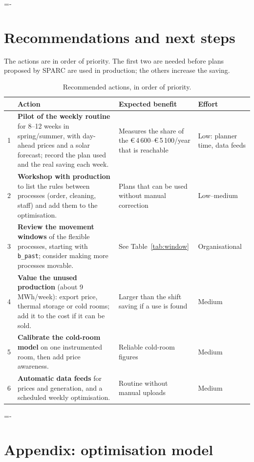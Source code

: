 \documentclass[10pt,a4paper]{scrartcl}
\makeatletter
\newcommand{\Eur}[1]{\euro\,#1}
\newcommand{\NeedSpace}[1]{\par\begingroup\dimen@=\pagegoal\advance\dimen@-\pagetotal
    \ifdim\dimen@<#1\relax\newpage\fi\endgroup}
\newcommand{\RuleSection}[1]{%
    \NeedSpace{10\baselineskip}%
    \section{#1}%
    \vspace{0.2em}{\color{accent!35}\hrule height 0.4pt}\vspace{0.3em}%
  }
\makeatother
\begin{document}
  \newpage
  \RuleSection{Recommendations and next steps}
  \label{sec:next}

  The actions are in order of priority. The first two are needed before plans proposed by SPARC are
  used in production; the others increase the saving.

  \begin{table}[H]
  \small
  \centering
  \renewcommand{\arraystretch}{1.2}
  \begin{tabularx}{\textwidth}{@{}L{0.5cm} Y L{3.2cm} L{2.6cm}@{}}
  \toprule
  & \textbf{Action} & \textbf{Expected benefit} & \textbf{Effort} \\
   & \textbf{Pilot of the weekly routine} for 8--12 weeks in spring/summer, with day-ahead prices
      and a solar forecast; record the plan used and the real saving each week. &
      Measures the share of the \Eur{4\,600}--\Eur{5\,100}/year that is reachable &
      Low: planner time, data feeds \\
  2 & \textbf{Workshop with production} to list the rules between processes (order, cleaning, staff)
      and add them to the optimisation. &
      Plans that can be used without manual correction & Low--medium \\
  3 & \textbf{Review the movement windows} of the flexible processes, starting with \texttt{b\_past};
      consider making more processes movable. &
      See Table~\ref{tab:window} & Organisational \\
  4 & \textbf{Value the unused production} (about 9\,MWh/week): export price, thermal storage or
      cold rooms; add it to the cost if it can be sold. &
      Larger than the shift saving if a use is found & Medium \\
  5 & \textbf{Calibrate the cold-room model} on one instrumented room, then add price awareness. &
      Reliable cold-room figures & Medium \\
  6 & \textbf{Automatic data feeds} for prices and generation, and a scheduled weekly optimisation. &
      Routine without manual uploads & Medium \\
  \bottomrule
  \end{tabularx}
  \caption{Recommended actions, in order of priority.}
  \end{table}

  \appendix
  \RuleSection{Appendix: optimisation model}
  \label{app:model}
\end{document}

